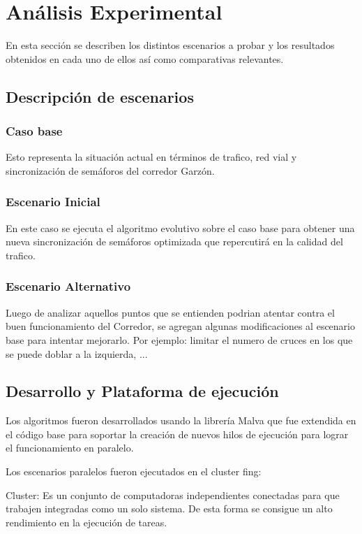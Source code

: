 \chapter{Análisis Experimental}
En esta sección se describen los distintos escenarios a probar y los resultados obtenidos en cada uno de ellos así como comparativas relevantes.

\section{Descripción de escenarios}

\subsection{Caso base}
Esto representa la situación actual en términos de trafico, red vial y sincronización de semáforos del corredor Garzón. 

\subsection{Escenario Inicial }
En este caso se ejecuta el algoritmo evolutivo sobre el caso base para obtener una nueva sincronización de semáforos optimizada que repercutirá en la calidad del trafico.

\subsection{Escenario Alternativo}
Luego de analizar aquellos puntos que se entienden podrian atentar contra el buen funcionamiento del Corredor, se agregan algunas modificaciones al escenario base para intentar mejorarlo. 
Por ejemplo: limitar el numero de cruces en los que se puede doblar a la izquierda, ...



\section{Desarrollo y Plataforma de ejecución }
Los algoritmos fueron desarrollados usando la librería Malva que fue extendida en el código base para soportar la creación de nuevos hilos de ejecución para lograr el funcionamiento en paralelo.


Los escenarios paralelos fueron ejecutados en el cluster fing:

Cluster: Es un conjunto de computadoras independientes conectadas para que trabajen integradas como un solo sistema. De esta forma se consigue un alto rendimiento en la ejecución de tareas. 

